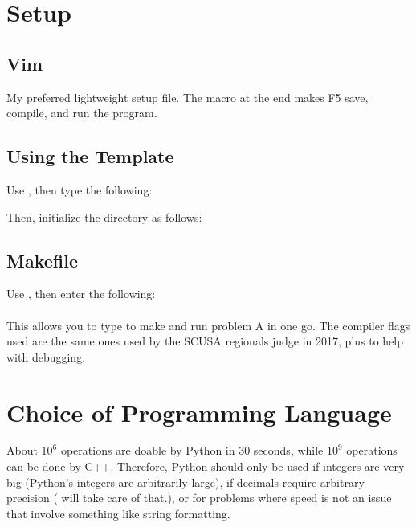 \documentclass[../main]{subfiles}
\begin{document}
\section{Setup}

\subsection{Vim}

My preferred lightweight setup file. The macro at the end makes F5 save, compile, and run the program.


\subsection{Using the Template}

Use , then type the following:


Then, initialize the directory as follows:\\


\subsection{Makefile}

Use , then enter the following:\\

\\

This allows you to type  to make and run problem A in one go. The compiler flags used are the same ones used by the SCUSA regionals judge in 2017, plus  to help with debugging.

\section{Choice of Programming Language}

About $10^6$ operations are doable by Python in 30 seconds, while $10^9$ operations can be done by C++. Therefore, Python should only be used if integers are very big (Python's integers are arbitrarily large), if decimals require arbitrary precision ( will take care of that.), or for problems where speed is not an issue that involve something like string formatting. 
\end{document}
